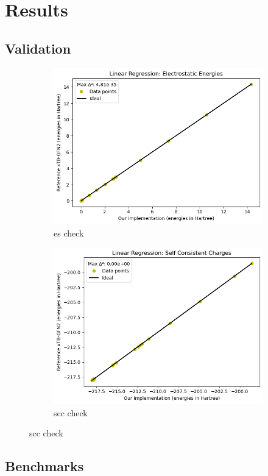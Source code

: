 \chapter{Results}

\section{Validation}

\begin{figure}[H]
\centering
\begin{subfigure}{.5\textwidth}
  \centering
  \includegraphics[width=.8\linewidth]{images/results/es_check}
  \caption{es check}
  \label{fig:es_check}
\end{subfigure}%
\begin{subfigure}{.5\textwidth}
  \centering
  \includegraphics[width=.8\linewidth]{images/results/scc_check}
  \caption{scc check}
  \label{fig:scc_check}
\end{subfigure}
\end{figure}

\section{Benchmarks}
